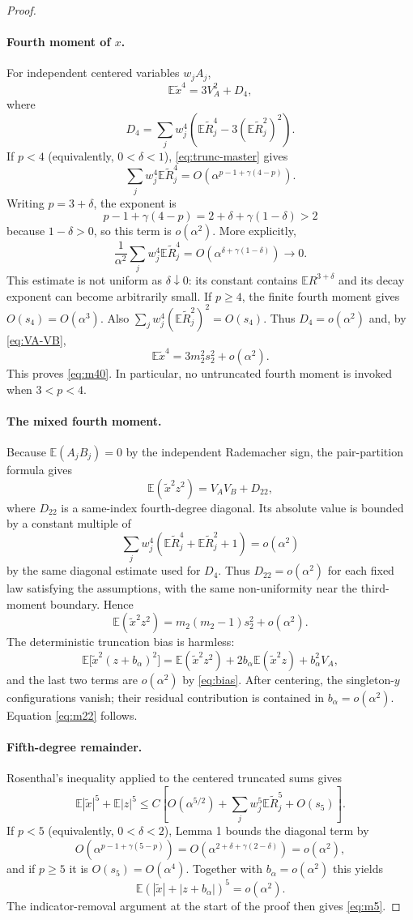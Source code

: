 \documentclass[11pt,a4paper]{article}
\newcommand{\E}{\mathbb E}
\begin{document}
\begin{proof}
\paragraph{Fourth moment of $x$.}
For independent centered variables $w_jA_j$,
\[
\E\widetilde x^4
=3V_A^2+D_4,
\]
where
\[
D_4=\sum_jw_j^4
\left(\E\widetilde R_j^4-3(\E\widetilde R_j^2)^2\right).
\]
If $p<4$ (equivalently, $0<\delta<1$), \eqref{eq:trunc-master} gives
\[
\sum_jw_j^4\E\widetilde R_j^4
=O\!\left(\alpha^{p-1+\gamma(4-p)}\right).
\]
Writing $p=3+\delta$, the exponent is
\[
p-1+\gamma(4-p)=2+\delta+\gamma(1-\delta)>2
\]
because $1-\delta>0$, so this term is $o(\alpha^2)$.  More explicitly,
\[
\frac{1}{\alpha^2}\sum_jw_j^4\E\widetilde R_j^4
=O\!\left(\alpha^{\delta+\gamma(1-\delta)}\right)\to0.
\]
This estimate is not uniform as $\delta\downarrow0$: its constant contains $\E R^{3+\delta}$ and its decay exponent can become arbitrarily small.  If $p\ge4$, the finite fourth moment gives $O(s_4)=O(\alpha^3)$.  Also $\sum_jw_j^4(\E\widetilde R_j^2)^2=O(s_4)$.  Thus $D_4=o(\alpha^2)$ and, by \eqref{eq:VA-VB},
\[
\E\widetilde x^4=3m_2^2s_2^2+o(\alpha^2).
\]
This proves \eqref{eq:m40}.  In particular, no untruncated fourth moment is invoked when $3<p<4$.

\paragraph{The mixed fourth moment.}
Because $\E(A_jB_j)=0$ by the independent Rademacher sign, the pair-partition formula gives
\[
\E(\widetilde x^2z^2)=V_AV_B+D_{22},
\]
where $D_{22}$ is a same-index fourth-degree diagonal.  Its absolute value is bounded by a constant multiple of
\[
\sum_jw_j^4\left(\E\widetilde R_j^4
+\E\widetilde R_j^2+1\right)=o(\alpha^2)
\]
by the same diagonal estimate used for $D_4$.  Thus $D_{22}=o(\alpha^2)$ for each fixed law satisfying the assumptions, with the same non-uniformity near the third-moment boundary.  Hence
\[
\E(\widetilde x^2z^2)
=m_2(m_2-1)s_2^2+o(\alpha^2).
\]
The deterministic truncation bias is harmless:
\[
\E\bigl[\widetilde x^2(z+b_\alpha)^2\bigr]
=\E(\widetilde x^2z^2)
+2b_\alpha\E(\widetilde x^2z)
+b_\alpha^2V_A,
\]
and the last two terms are $o(\alpha^2)$ by \eqref{eq:bias}.  After centering,
the singleton-$y$ configurations vanish; their residual contribution is
contained in $b_\alpha=o(\alpha^2)$.  Equation \eqref{eq:m22} follows.

\paragraph{Fifth-degree remainder.}
Rosenthal's inequality applied to the centered truncated sums gives
\[
\E|\widetilde x|^5+\E|z|^5
\le C\left[O(\alpha^{5/2})
+\sum_jw_j^5\E\widetilde R_j^5+O(s_5)\right].
\]
If $p<5$ (equivalently, $0<\delta<2$), Lemma 1 bounds the diagonal term by
\[
O\!\left(\alpha^{p-1+\gamma(5-p)}\right)
=O\!\left(\alpha^{2+\delta+\gamma(2-\delta)}\right)
=o(\alpha^2),
\]
and if $p\ge5$ it is $O(s_5)=O(\alpha^4)$.  Together with $b_\alpha=o(\alpha^2)$ this yields
\[
\E(|\widetilde x|+|z+b_\alpha|)^5=o(\alpha^2).
\]
The indicator-removal argument at the start of the proof then gives \eqref{eq:m5}.
\end{proof}
\end{document}
